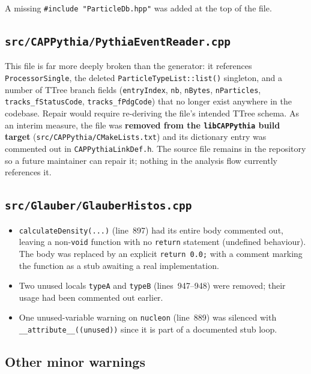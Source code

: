 \documentclass[11pt,a4paper]{article}
\begin{document}
\noindent
A missing \verb|#include "ParticleDb.hpp"| was added at the top of the
file.

\subsection{\texttt{src/CAPPythia/PythiaEventReader.cpp}}

This file is far more deeply broken than the generator: it references
\texttt{ProcessorSingle}, the deleted \texttt{ParticleTypeList::list()}
singleton, and a number of TTree branch fields (\texttt{entryIndex},
\texttt{nb}, \texttt{nBytes}, \texttt{nParticles},
\texttt{tracks\_fStatusCode}, \texttt{tracks\_fPdgCode}) that no longer
exist anywhere in the codebase. Repair would require re-deriving the
file's intended TTree schema. As an interim measure, the file was
\textbf{removed from the \texttt{libCAPPythia} build target}
(\texttt{src/CAPPythia/CMakeLists.txt}) and its dictionary entry was
commented out in \texttt{CAPPythiaLinkDef.h}. The source file remains in
the repository so a future maintainer can repair it; nothing in the
analysis flow currently references it.

\subsection{\texttt{src/Glauber/GlauberHistos.cpp}}

\begin{itemize}[leftmargin=2em,itemsep=0pt]
  \item \texttt{calculateDensity(...)} (line~897) had its entire body
        commented out, leaving a non-\texttt{void} function with no
        \texttt{return} statement (undefined behaviour). The body was
        replaced by an explicit \texttt{return~0.0;} with a comment
        marking the function as a stub awaiting a real implementation.
  \item Two unused locals \texttt{typeA} and \texttt{typeB} (lines~947--948)
        were removed; their usage had been commented out earlier.
  \item One unused-variable warning on \texttt{nucleon} (line~889) was
        silenced with \texttt{\_\_attribute\_\_((unused))} since it is part
        of a documented stub loop.
\end{itemize}

\subsection{Other minor warnings}
\end{document}
